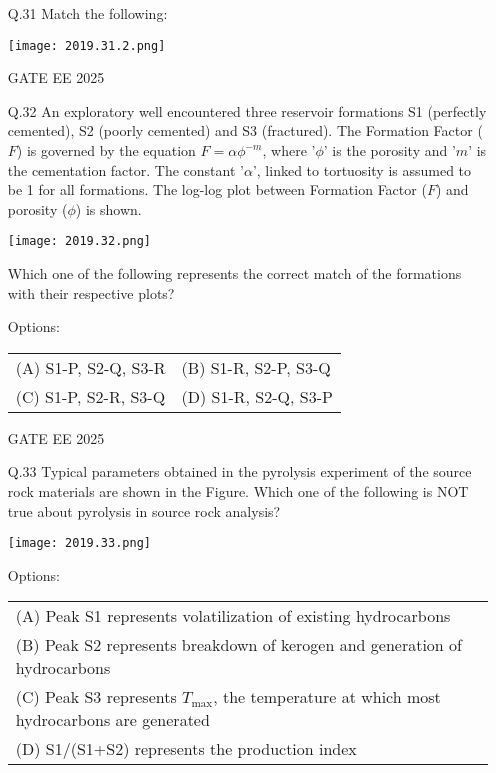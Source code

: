 \documentclass{article}
\begin{document}
\begin{enumerate}[leftmargin=*,series=q]
\setcounter{enumi}{30} %

\item[Q.31] Match the following:

\texttt{[image: 2019.31.2.png]}

GATE EE 2025
 \vspace{0.5cm} 
\item[Q.32] An exploratory well encountered three reservoir formations S1 (perfectly cemented), S2 (poorly cemented) and S3 (fractured). The Formation Factor ($F$) is governed by the equation $F = \alpha \phi^{-m}$, where '$\phi$' is the porosity and '$m$' is the cementation factor. The constant '$\alpha$', linked to tortuosity is assumed to be 1 for all formations. The log-log plot between Formation Factor ($F$) and porosity ($\phi$) is shown.
\begin{center}
\texttt{[image: 2019.32.png]}
\end{center}

Which one of the following represents the correct match of the formations with their respective plots?

Options:
\begin{tabular}{ll}
(A) S1-P, S2-Q, S3-R & (B) S1-R, S2-P, S3-Q \\
(C) S1-P, S2-R, S3-Q & (D) S1-R, S2-Q, S3-P
\end{tabular}

GATE EE 2025
 \vspace{0.5cm} 
\item[Q.33] Typical parameters obtained in the pyrolysis experiment of the source rock materials are shown in the Figure. Which one of the following is NOT true about pyrolysis in source rock analysis?

\begin{center}
\texttt{[image: 2019.33.png]}
\end{center}

Options:
\begin{tabular}{ll}
(A) Peak S1 represents volatilization of existing hydrocarbons \\
(B) Peak S2 represents breakdown of kerogen and generation of hydrocarbons \\
(C) Peak S3 represents $T_{\text{max}}$, the temperature at which most hydrocarbons are generated \\
(D) S1/(S1+S2) represents the production index
\end{tabular}


\end{enumerate}
\end{document}
